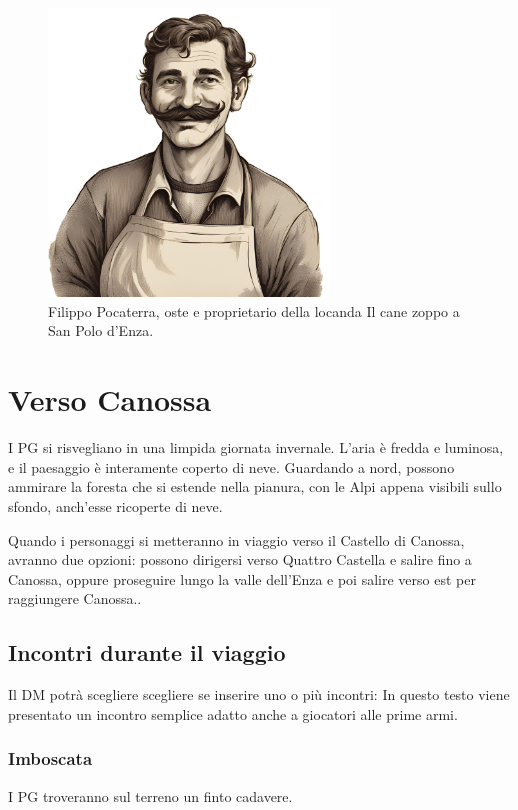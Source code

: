 \documentclass[letterpaper,twocolumn,openany,nodeprecatedcode]{dndbook}
\begin{document}
\begin{figure}
\centering
\includegraphics[width=7.5cm]{img/filippo-pocaterra.png}
    \caption{\textsf{Filippo Pocaterra, oste e proprietario della locanda Il cane zoppo a San Polo d'Enza.}\cite{url:ai}}
    \label{fig:oste}
\end{figure}




\chapter{Verso Canossa}
 I PG si risvegliano in una limpida giornata invernale. L'aria è fredda e luminosa, e il paesaggio è interamente coperto di neve. Guardando a nord, possono ammirare la foresta che si estende nella pianura, con le Alpi appena visibili sullo sfondo, anch'esse ricoperte di neve.

Quando i personaggi si metteranno in viaggio verso il Castello di Canossa, avranno due opzioni: possono dirigersi verso Quattro Castella e salire fino a Canossa, oppure proseguire lungo la valle dell'Enza e poi salire verso est per raggiungere Canossa..

\section{Incontri durante il viaggio}
Il DM potrà scegliere scegliere se inserire uno o più incontri: In questo testo viene presentato un incontro semplice adatto anche a giocatori alle prime armi.

\subsection{Imboscata}
I PG troveranno sul terreno un finto cadavere.
\end{document}
